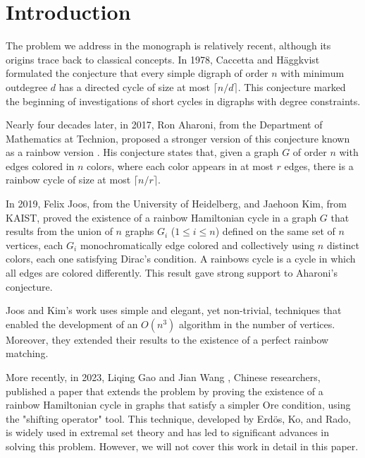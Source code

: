 
\chapter*{Introduction}

The problem we address in the monograph is relatively recent, although its origins trace back to classical concepts. 
In 1978, Caccetta and Häggkvist \cite{nathanson2006caccettahaggkvistconjectureadditivenumber} formulated the conjecture 
that every simple digraph of order $n$ with minimum outdegree $d$ 
has a directed cycle of size at most $\lceil n/d \rceil$. This conjecture marked the beginning of investigations 
of short cycles in digraphs with degree constraints.

Nearly four decades later, in 2017, Ron Aharoni, from the Department of Mathematics at Technion, proposed a stronger 
version of this conjecture known as a rainbow version \cite{AharonisConjecture}. His conjecture states that, given a graph $G$ of order $n$ 
with edges colored in $n$ colors, where each color appears in at most $r$ edges, there is a rainbow cycle of size 
at most $\lceil n/r \rceil$.

In 2019, Felix Joos, from the University of Heidelberg, and Jaehoon Kim, from KAIST, 
proved the existence of a rainbow Hamiltonian cycle in a graph $G$ that results from the union of $n$ graphs
$G_i$ ($1 \leq i \leq n$) defined on the same set of $n$ vertices, each $G_i$ monochromatically edge colored
and collectively using $n$ distinct colors, each one satisfying Dirac's condition. A rainbows cycle is a cycle 
in which all edges are colored differently. This result gave strong support to Aharoni's conjecture.

Joos and Kim's work uses simple and elegant, yet non-trivial, techniques that enabled the development of an $O(n^3)$ 
algorithm in the number of vertices. Moreover, they extended their results to the existence of a perfect rainbow 
matching.

More recently, in 2023, Liqing Gao and Jian Wang \cite{gao_wang_2024}, Chinese researchers, published a paper that extends the problem 
by proving the existence of a rainbow Hamiltonian cycle in graphs that satisfy a simpler Ore condition, using the 
"shifting operator" tool. This technique, developed by Erdös, Ko, and Rado, is widely used in extremal set theory 
and has led to significant advances in solving this problem. However, we will not cover this work in detail in 
this paper.


